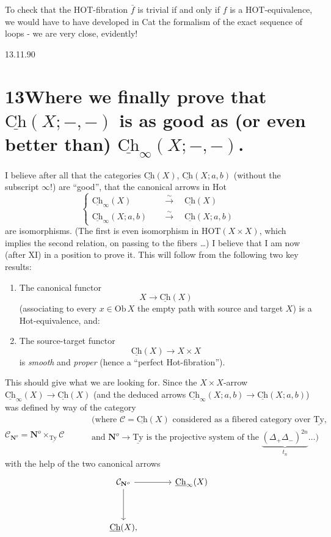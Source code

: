 \documentclass[11pt]{article}
\newcommand{\printedpage}[1]{\marginpar{\footnotesize p.~#1}}
\newcommand{\msp}[1]{\marginpar{\footnotesize [#1]}}
\newcommand{\Ch}{\underline{\mathrm{Ch}}}
\newcommand{\Ty}{\underline{\mathrm{Ty}}}
\begin{document}
To check that the HOT-fibration $\bar f$ is trivial if and only if $f$ is a HOT-equivalence, we would have to have developed in Cat the formalism of the exact sequence of loops - we are very close, evidently!

\printedpage{98}
\msp{page 157}

\begin{flushright}
\footnotesize 13.11.90
\end{flushright}

\section*{13\quad Where we finally prove that $\Ch(X;-,-)$ is as good as (or even better than) $\Ch_\infty(X;-,-)$.}

I believe after all that the categories $\Ch(X)$, $\Ch(X;a,b)$ (without the subscript $\infty$!) are ``good'', that the canonical arrows in Hot
\[
\left\{
\begin{aligned}
\Ch_\infty(X) \quad &\xrightarrow{\sim} \quad \Ch(X)\\
\Ch_\infty(X;a,b) \quad &\xrightarrow{\sim} \quad \Ch(X;a,b)
\end{aligned}
\right.
\]
are isomorphisms. (The first is even isomorphism in $\mathrm{HOT}(X \times X)$, which implies the second relation, on passing to the fibers \dots) I believe that I am now (after XI) in a position to prove it. This will follow from the following two key results:

\begin{enumerate}
\item[1)] The canonical functor
\[
X \longrightarrow \Ch(X)
\]
(associating to every $x \in \mathrm{Ob}\,X$ the empty path with source and target $X$) is a Hot-equivalence, and: %
\item[2)] The source-target functor
\[
\Ch(X) \longrightarrow X \times X
\]
is \textit{smooth} and \textit{proper} (hence a ``perfect Hot-fibration'').
\end{enumerate}

This should give what we are looking for. Since the $X \times X$-arrow $\Ch_\infty(X) \longrightarrow \Ch(X)$ (and the deduced arrows $\Ch_\infty(X;a,b) \longrightarrow \Ch(X;a,b)$) was defined by way of the category
\[
\mathcal{C}_{\mathbf{N}^o} = \mathbf{N}^o \times_{\Ty} \mathcal{C}
\qquad
\begin{aligned}
&\text{(where $\mathcal{C} = \Ch(X)$ considered as a fibered category over $\Ty$,}\\
&\text{and $\mathbf{N}^o \longrightarrow \Ty$ is the projective system of the $\underbrace{(\Delta_+\Delta_-)^{2n}}_{t_n} \dots$)}
\end{aligned}
\]
\msp{page 158}
with the help of the two canonical arrows
\[
\begin{tikzcd}[row sep=huge, column sep=large]
\mathcal{C}_{\mathbf{N}^o} \arrow[r] \arrow[d] & \Ch_\infty(X) \\
\Ch(X), &
\end{tikzcd}
\]
\end{document}
